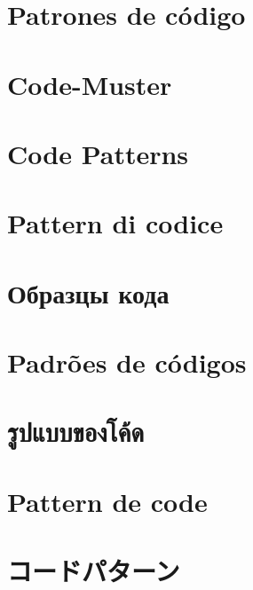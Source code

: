 \ifdefined\SPANISH
\chapter{Patrones de código}
\fi %

\ifdefined\GERMAN
\chapter{Code-Muster}
\fi %

\ifdefined\ENGLISH
\chapter{Code Patterns}
\fi %

\ifdefined\ITALIAN
\chapter{Pattern di codice}
\fi %

\ifdefined\RUSSIAN
\chapter{Образцы кода}
\fi %

\ifdefined\BRAZILIAN
\chapter{Padrões de códigos}
\fi %

\ifdefined\THAI
\chapter{รูปแบบของโค้ด}
\fi %

\ifdefined\FRENCH
\chapter{Pattern de code}%
\fi %

\ifdefined\POLISH
\chapter{\PLph{}}
\fi %

\ifdefined\JAPANESE
\chapter{コードパターン}
\fi %

\ifdefined\TURKISH
